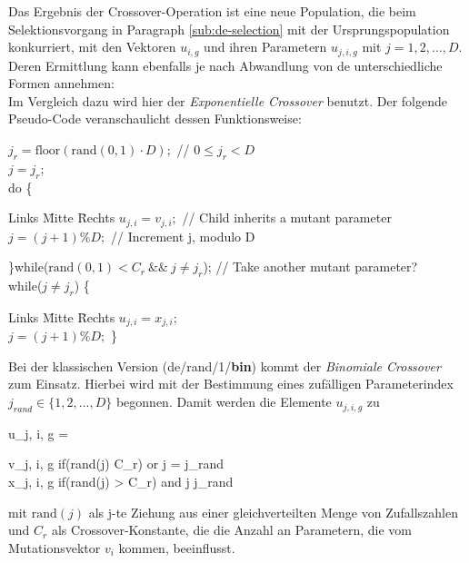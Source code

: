 			Das Ergebnis der Crossover-Operation ist eine neue Population, die 
			beim Selektionsvorgang in Paragraph \ref{sub:de-selection} mit der 
			Ursprungspopulation konkurriert, mit den Vektoren $u_{i, g}$ und 
			ihren Parametern $u_{j, i, g}$ mit $j = 1, 2, ... , D$. Deren 
			Ermittlung kann ebenfalls je nach Abwandlung von \gls{de} 
			unterschiedliche Formen annehmen: \\
			Im Vergleich dazu wird hier der \textit{Exponentielle Crossover} benutzt. Der folgende Pseudo-Code veranschaulicht dessen Funktionsweise:\\
			\begin{algorithm*}[H]
				\SetAlgoLined
				$j_{r} = \textrm{floor}(\textrm{rand}(0,1) \cdot D);$ // $0 \leq j_{r} < D$\\
				$j = j_{r};$\\
				do \{
				\begin{tabbing}
					Links \= Mitte \= Rechts \kill
					\>$u_{j,i} = v_{j,i};$ \qquad // Child inherits a mutant parameter\\
					\>$j = (j+1) \% D;$ \qquad // Increment j, modulo D 
				\end{tabbing}
				\}while($\textrm{rand}(0,1) < C_{r} \ \&\& \ j \neq j_{r}$); // Take another mutant parameter?\\
				while($j \neq j_{r}$) \{
				\begin{tabbing}
					Links \= Mitte \= Rechts \kill
					\>$u_{j,i} = x_{j,i};$ \\
					\>$j = (j+1) \% D;$ \}
				\end{tabbing}
			\end{algorithm*}
			\begin{center}
			\end{center}
			
			Bei der klassischen Version (\gls{de}/rand/1/\textbf{bin}) kommt der \textit{Binomiale Crossover} zum Einsatz. Hierbei wird mit der Bestimmung eines zufälligen Parameterindex $j_{rand} \in \{1,2,...,D\}$ begonnen. Damit werden die Elemente $u_{j, i, g}$ zu
			\begin{flalign}
				\centering
				u_{j, i, g} = 
				\begin{cases}
				v_{j, i, g} \quad \textrm{if}(\textrm{rand}(j) \leq C_{r}) \textrm{ or } j = j_{rand} \\
				x_{j, i, g} \quad \textrm{if}(\textrm{rand}(j) > C_{r}) \textrm{ and } j \neq j_{rand}
				\end{cases}
				\label{eq:de-bin-cross}
			\end{flalign}
			mit $\textrm{rand}(j)$ als j-te Ziehung aus einer gleichverteilten Menge von Zufallszahlen und $C_{r}$ als Crossover-Konstante, die die Anzahl an Parametern, die vom Mutationsvektor $v_{i}$ kommen, beeinflusst.
			
